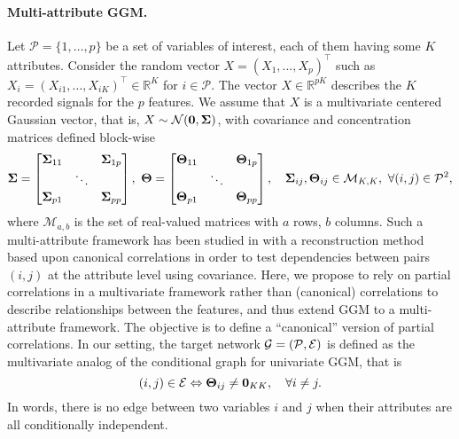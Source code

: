 \paragraph*{Multi-attribute GGM.}   Let $\mathcal{P}=\{1,\dots,p\}$ be
a  set  of  variables  of  interest, each  of  them  having  some  $K$
attributes.    Consider  the   random   vector  $X   =  (X_1,   \dots,
X_p)^\intercal$  such  as  $X_i  =(X_{i1},\dots,X_{iK})^\intercal  \in
\mathbb{R}^K$ for $i\in\mathcal{P}$. The vector $X\in \mathbb{R}^{pK}$
describes the  $K$ recorded signals  for the $p$ features.   We assume
that $X$ is a multivariate centered  Gaussian vector, that is, $X \sim
\mathcal{N}(\mathbf{0}, {\boldsymbol\Sigma})$,  with covariance  and concentration
matrices defined block-wise
\[
{\boldsymbol\Sigma} = \begin{bmatrix}
  {\boldsymbol\Sigma}_{11} & & {\boldsymbol\Sigma}_{1p} \\
  & \ddots & \\
  {\boldsymbol\Sigma}_{p1} & & {\boldsymbol\Sigma}_{pp} \\
\end{bmatrix}, \ \boldsymbol\Theta = \begin{bmatrix}
  \boldsymbol\Theta_{11} & & \boldsymbol\Theta_{1p} \\
  & \ddots & \\
  \boldsymbol\Theta_{p1} & & \boldsymbol\Theta_{pp} \\
\end{bmatrix}, \quad {\boldsymbol\Sigma}_{ij}, \boldsymbol\Theta_{ij}\in \mathcal{M}_{K,K},
\ \forall (i,j)\in\mathcal{P}^2,
\]
where $\mathcal{M}_{a,b}$ is the set  of real-valued matrices with $a$
rows, $b$ columns.   Such a multi-attribute framework  has been studied
in \cite{katenka2012inference} with a reconstruction method based upon
canonical  correlations in  order to  test dependencies  between pairs
$(i,j)$ at the attribute level  using covariance.  Here, we propose to
rely on partial  correlations in a multivariate  framework rather than
(canonical)  correlations   to  describe  relationships   between  the
features, and  thus extend  GGM to  a multi-attribute  framework.  The
objective   is  to   define   a  ``canonical''   version  of   partial
correlations.      In    our     setting,    the     target    network
$\mathcal{G}=(\mathcal{P},\mathcal{E})$  is  defined  as  the  multivariate
analog of the conditional graph for univariate GGM, that is
\begin{equation}
  \label{eq:multi_net}
  (i,j)  \in  \mathcal{E}  \Leftrightarrow \boldsymbol\Theta_{ij}  \neq  \mathbf{0}_{KK},
  \quad \forall i\neq j.
\end{equation}
In words,  there is  no edge  between two variables  $i$ and  $j$ when
their attributes are all conditionally independent.

